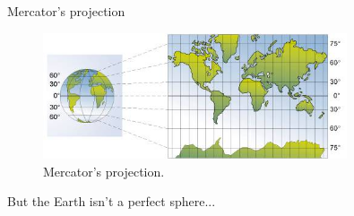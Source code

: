 \documentclass[10pt]{beamer}
\begin{document}
\begin{frame}{Mercator's projection}
  \begin{figure}[H]
    \centering
    \includegraphics[width=0.8\textwidth]{images/mercator.jpg}
    \caption{Mercator's projection\cite{img:mercator}.}
\end{figure}
But the Earth isn't a perfect sphere...
\end{frame}
\end{document}
